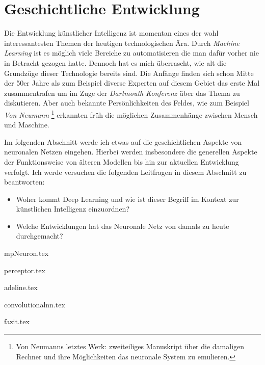 \part{Geschichtliche Entwicklung}

Die Entwicklung künstlicher Intelligenz ist momentan eines der wohl interessantesten Themen der heutigen technologischen Ära. Durch \emph{Machine Learning} ist es möglich viele Bereiche zu automatisieren die man dafür vorher nie in Betracht gezogen hatte. Dennoch hat es mich überrascht, wie \glqq alt \grqq die Grundzüge dieser Technologie bereits sind. Die Anfänge finden sich schon Mitte der 50er Jahre als zum Beispiel diverse Experten auf diesem Gebiet das erste Mal zusammentrafen um im Zuge der \emph{Dartmouth Konferenz} über das Thema zu diskutieren. Aber auch bekannte Persönlichkeiten des Feldes, wie zum Beispiel \emph{Von Neumann} \footnote{Von Neumanns letztes Werk: zweiteiliges Manuskript über die damaligen Rechner und ihre Möglichkeiten das neuronale System zu emulieren.} erkannten früh die möglichen Zusammenhänge zwischen Mensch und Maschine.

Im folgenden Abschnitt werde ich etwas auf die geschichtlichen Aspekte von neuronalen Netzen eingehen. Hierbei werden insbesondere die generellen Aspekte der Funktionsweise von älteren Modellen bis hin zur aktuellen Entwicklung verfolgt. Ich werde versuchen die folgenden Leitfragen in diesem Abschnitt zu beantworten: 

\begin{itemize}
\item Woher kommt Deep Learning und wie ist dieser Begriff im Kontext zur künstlichen Intelligenz einzuordnen?
\item Welche Entwicklungen hat das Neuronale Netz von damals zu heute durchgemacht?
\end{itemize}


{mpNeuron.tex}
\clearpage

{perceptor.tex}
\clearpage

{adeline.tex}
\clearpage

{convolutionalnn.tex}
\clearpage

{fazit.tex}